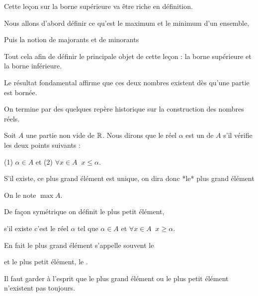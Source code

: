 







\debuttexte

\diapo


\change
Cette leçon sur la borne supérieure va être riche en définition.

\change

Nous allons d'abord définir ce qu'est le maximum et le minimum d'un ensemble,

\change

Puis la notion de majorants et de minorants

\change

Tout cela afin de définir le principale objet de cette leçon : la borne supérieure
et la borne inférieure.

Le résultat fondamental affirme que ces deux nombres existent dès qu'une partie est bornée.


\change

On termine par des quelques repère historique sur la construction des nombres réels.


\diapo


Soit $A$ une partie non vide de $\mathbb{R}$. Nous dirons que le réel $\alpha$ est un 
 de $A$ s'il vérifie les deux points suivants :

(1) $\alpha \in A$ 
et 
(2) $\forall x \in A \;\; x\leq \alpha$.

\change


S'il existe, ce plus grand élément est unique, on dira donc *le* plus grand élément

On le note  $\max A$.

\change

De façon symétrique on définit le plus petit élément, 

s'il existe c'est le réel $\alpha$ tel que $\alpha \in A$ et $\forall x \in A \;\; x \ge \alpha$.

\change

En fait le plus grand élément s'appelle souvent le  

et le plus petit élément, le .


Il faut garder à l'esprit que le plus grand élément ou le plus petit élément n'existent pas toujours.


